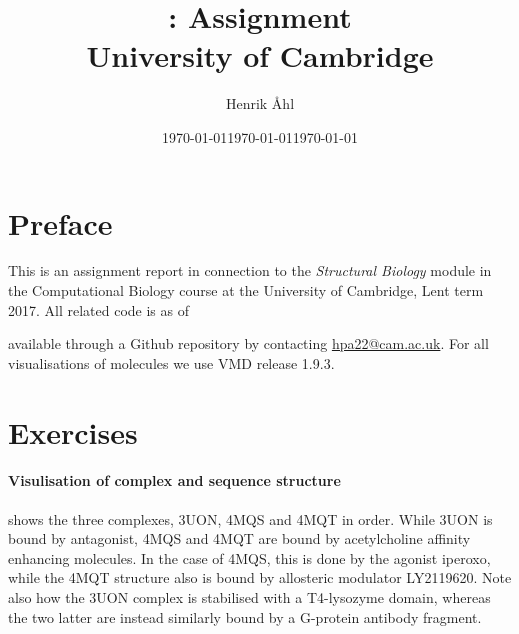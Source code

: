 \documentclass[10pt]{article}\usepackage[]{graphicx}\usepackage[]{color}
\title{\phantom{p}
  \bf \course: Assignment \ass \\[1em]
  \small{University of Cambridge}
}
\author{Henrik Åhl}
\date{\today}
\theoremstyle{plain}
\newcommand{\course}{Structural Biology}
\newcommand{\term}{Lent term 2017}
\begin{document}
\date{\today}
\maketitle
\setcounter{page}{1}


\phantom{a}
\maketitle
\begin{multicols*}{2}
\section*{Preface}
  This is an assignment report in connection to the \textit{\course}
  module in the Computational Biology course at the University of Cambridge,
  \term. All related code is as of \date{\today} available through a
  Github repository by contacting \href{mailto:hpa22@cam.ac.uk}{hpa22@cam.ac.uk}. 
  For all visualisations of molecules we use VMD release 1.9.3.
  
\section*{Exercises}
\paragraph*{Visulisation of complex and sequence structure\\}
   shows the three complexes, 3UON, 4MQS and 4MQT in order. While 3UON is bound by antagonist, 4MQS and 4MQT are bound by acetylcholine affinity enhancing molecules. In the case of 4MQS, this is done by the agonist iperoxo, while the 4MQT structure also is bound by allosteric modulator LY2119620. Note also how the 3UON complex is stabilised with a T4-lysozyme domain, whereas the two latter are instead similarly bound by a G-protein antibody fragment. 


\end{multicols*}
\end{document}
